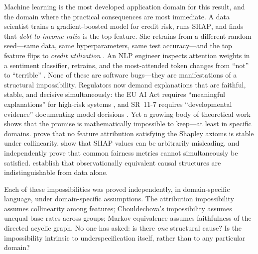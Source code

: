 \documentclass{article}
\newcommand{\SHAP}{\textsc{SHAP}}
\begin{document}
Machine learning is the most developed application domain for this result,
and the domain where the practical consequences are most immediate.
A data scientist trains a gradient-boosted model for credit risk, runs \SHAP{},
and finds that \emph{debt-to-income ratio} is the top feature.  She retrains
from a different random seed---same data, same hyperparameters, same test
accuracy---and the top feature flips to \emph{credit utilization}
\citep{krishna2022disagreement}.  An NLP engineer inspects attention weights in
a sentiment classifier, retrains, and the most-attended token changes from
``not'' to ``terrible'' \citep{jainwallace2019}.
None of these are software bugs---they are manifestations of a structural
impossibility.
Regulators now demand explanations that are faithful, stable, and decisive
simultaneously: the EU AI Act requires ``meaningful explanations'' for
high-risk systems \citep{euaiact2024}, and SR~11-7 requires
``developmental evidence'' documenting model decisions
\citep{occ2011sr117}.  Yet a growing body of theoretical work shows that the
promise is mathematically impossible to keep---at least in specific domains.
\citet{bilodeau2024impossibility} prove that no feature attribution satisfying
the Shapley axioms is stable under collinearity.
\citet{huang2024failings} show that SHAP values can be arbitrarily
misleading.  \citet{chouldechova2017fair} and \citet{kleinberg2017inherent}
independently prove that common fairness metrics cannot simultaneously be
satisfied.  \citet{verma1991equivalence} establish that observationally
equivalent causal structures are indistinguishable from data alone.

Each of these impossibilities was proved independently, in domain-specific
language, under domain-specific assumptions.  The attribution impossibility
assumes collinearity among features; Chouldechova's impossibility assumes
unequal base rates across groups; Markov equivalence assumes faithfulness of
the directed acyclic graph.  No one has asked: is there \emph{one} structural
cause?  Is the impossibility intrinsic to underspecification itself, rather
than to any particular domain?
\end{document}
